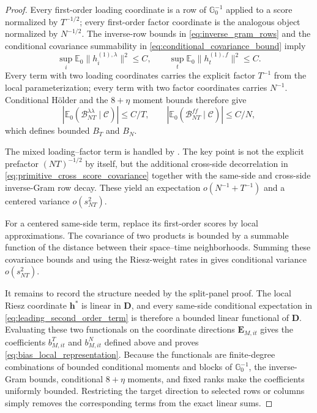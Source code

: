 \documentclass[11pt]{article}
\numberwithin{equation}{section}
\theoremstyle{remark}
\newcommand{\Ezero}{\mathbb E_0}
\newcommand{\bD}{\bm D}
\begin{document}
\begin{proof}
Every first-order loading coordinate is a row of $\mathbb G_0^{-1}$ applied to a score normalized by $T^{-1/2}$; every first-order factor coordinate is the analogous object normalized by $N^{-1/2}$. The inverse-row bounds in \eqref{eq:inverse_gram_rows} and the conditional covariance summability in \eqref{eq:conditional_covariance_bound} imply
$$
\sup_i\Ezero\|h_i^{(1),\lambda}\|^2\le C,
\qquad
\sup_t\Ezero\|h_t^{(1),f}\|^2\le C.
$$
Every term with two loading coordinates carries the explicit factor $T^{-1}$ from the local parameterization; every term with two factor coordinates carries $N^{-1}$. Conditional H\"older and the $8+\eta$ moment bounds therefore give
$$
\left|\Ezero(\mathcal B_{NT}^{\lambda\lambda}\mid\mathscr C)\right|\le C/T,
\qquad
\left|\Ezero(\mathcal B_{NT}^{ff}\mid\mathscr C)\right|\le C/N,
$$
which defines bounded $B_T$ and $B_N$.

The mixed loading--factor term is handled by . The key point is not the explicit prefactor $(NT)^{-1/2}$ by itself, but the additional cross-side decorrelation in \eqref{eq:primitive_cross_score_covariance} together with the same-side and cross-side inverse-Gram row decay. These yield an expectation $o(N^{-1}+T^{-1})$ and a centered variance $o(s_{NT}^2)$.

For a centered same-side term, replace its first-order scores by local approximations. The covariance of two products is bounded by a summable function of the distance between their space--time neighborhoods. Summing these covariance bounds and using the Riesz-weight rates in  gives conditional variance $o(s_{NT}^2)$.

It remains to record the structure needed by the split-panel proof. The local Riesz coordinate $\bm h^*$ is linear in $\bD$, and every same-side conditional expectation in \eqref{eq:leading_second_order_term} is therefore a bounded linear functional of $\bD$. Evaluating these two functionals on the coordinate directions $\bm E_{M,it}$ gives the coefficients $b_{M,it}^{T}$ and $b_{M,it}^{N}$ defined above and proves \eqref{eq:bias_local_representation}. Because the functionals are finite-degree combinations of bounded conditional moments and blocks of $\mathbb G_0^{-1}$, the inverse-Gram bounds, conditional $8+\eta$ moments, and fixed ranks make the coefficients uniformly bounded. Restricting the target direction to selected rows or columns simply removes the corresponding terms from the exact linear sums.
\end{proof}
\end{document}
